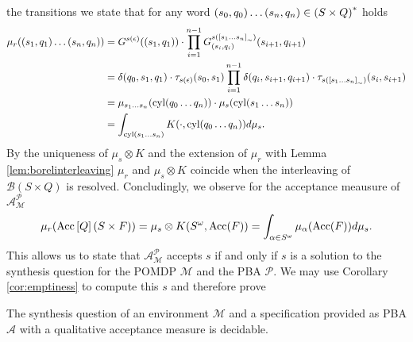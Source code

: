 the transitions we state that for any word 
$\left(s_{0}, q_{0}\right)\dots\left(s_{n}, q_{n}\right)\in\left(S\times Q\right)^{*}$ holds
\begin{align*}
  \mu_{r}(\left(s_{1}, q_{1}\right)\dots\left(s_{n}, q_{n}\right)) &= 
    G^{s(\epsilon)}(\left(s_{1}, q_{1}\right))\cdot 
    \prod\limits_{i = 1}^{n-1}
      G^{s(\left[s_{1}\dots s_{n}\right]_{\sim})}_{\left(s_{i}, q_{i}\right)}(
        s_{i+1}, q_{i+1})\\
  &= \delta(q_{0}, s_{1}, q_{1})\cdot\tau_{s(\epsilon)}(s_{0}, s_{1})
    \prod\limits_{i = 1}^{n-1}
      \delta(q_{i}, s_{i+1}, q_{i+1})\cdot
      \tau_{s(\left[s_{1}\dots s_{n}\right]_{\sim})}(s_{i}, s_{i+1})\\
  &= \mu_{s_{1}\dots s_{n}}(\operatorname{cyl}(q_{0}\dots q_{n}))\cdot
    \mu_{s}(\operatorname{cyl}(s_{1}\dots s_{n}))\\
  &= \int_{\operatorname{cyl}(s_{1}\dots s_{n})}K(\cdot, \operatorname{cyl}(q_{0}\dots q_{n}))d\mu_{s}.
\end{align*}
By the uniqueness of $\mu_{s}\otimes K$ and the extension of $\mu_{r}$ with
Lemma \ref{lem:borelinterleaving} $\mu_{r}$ and $\mu_{s}\otimes K$ coincide
when the interleaving of $\mathcal{B}(S\times Q)$ is resolved. Concludingly, we
observe for the acceptance meausure of
$\mathcal{A}_{\mathcal{M}}^{\mathcal{P}}$
\begin{equation*}
  \mu_{r}(\operatorname{Acc}\left[Q\right](S\times F))
  = \mu_{s}\otimes K(S^{\omega}, \operatorname{Acc}(F))
  = \int_{\alpha\in S^{\omega}}\mu_{\alpha}(\operatorname{Acc}(F)) d\mu_{s}.
\end{equation*}
This allows us to state that $\mathcal{A}_{\mathcal{M}}^{\mathcal{P}}$ 
accepts $s$ if and only if $s$ is a solution to the synthesis question for 
the \ac{POMDP} $\mathcal{M}$ and the \ac{PBA} $\mathcal{P}$. We may use
Corollary \ref{cor:emptiness} to compute this $s$ and therefore prove
\begin{theorem}
  The synthesis question of an environment $\mathcal{M}$ and a specification
  provided as \ac{PBA} $\mathcal{A}$ with a qualitative acceptance measure
  is decidable.
  \label{thm:pbasynthesis}
\end{theorem}

